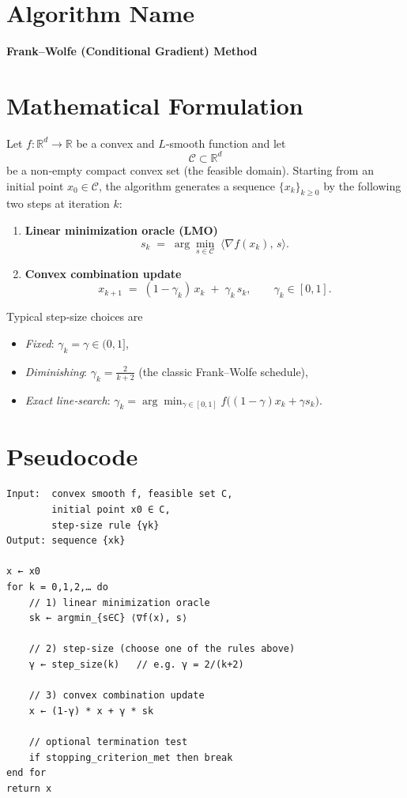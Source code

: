 \documentclass{article}
\newcommand{\R}{\mathbb{R}}
\begin{document}
\section*{Algorithm Name}
\textbf{Frank–Wolfe (Conditional Gradient) Method}

\section*{Mathematical Formulation}
Let $f:\R^{d}\rightarrow\R$ be a convex and $L$‑smooth function and let 
\[
\mathcal C\subset\R^{d}
\]
be a non‑empty compact convex set (the feasible domain).  
Starting from an initial point $x_{0}\in\mathcal C$, the algorithm generates a sequence
$\{x_{k}\}_{k\ge 0}$ by the following two steps at iteration $k$:

\begin{enumerate}[label=\arabic*.]
\item \textbf{Linear minimization oracle (LMO)}  
\[
s_{k}\;=\;\arg\min_{s\in\mathcal C}\;\langle \nabla f(x_{k}),\,s\rangle .
\tag{1}
\]

\item \textbf{Convex combination update}  
\[
x_{k+1}\;=\;(1-\gamma_{k})\,x_{k}\;+\;\gamma_{k}\,s_{k},
\qquad \gamma_{k}\in[0,1].
\tag{2}
\]
\end{enumerate}
Typical step‑size choices are  

\begin{itemize}
\item \emph{Fixed}: $\gamma_{k}=\gamma\in(0,1]$,
\item \emph{Diminishing}: $\displaystyle \gamma_{k}=\frac{2}{k+2}$ (the classic Frank–Wolfe schedule),
\item \emph{Exact line‑search}: $\displaystyle 
\gamma_{k}=\arg\min_{\gamma\in[0,1]} f\big((1-\gamma)x_{k}+\gamma s_{k}\big)$.
\end{itemize}

\section*{Pseudocode}
\begin{verbatim}
Input:  convex smooth f, feasible set C, 
        initial point x0 ∈ C, 
        step‑size rule {γk}
Output: sequence {xk}

x ← x0
for k = 0,1,2,… do
    // 1) linear minimization oracle
    sk ← argmin_{s∈C} ⟨∇f(x), s⟩
    
    // 2) step‑size (choose one of the rules above)
    γ ← step_size(k)   // e.g. γ = 2/(k+2)
    
    // 3) convex combination update
    x ← (1‑γ) * x + γ * sk
    
    // optional termination test
    if stopping_criterion_met then break
end for
return x
\end{verbatim}
\end{document}
